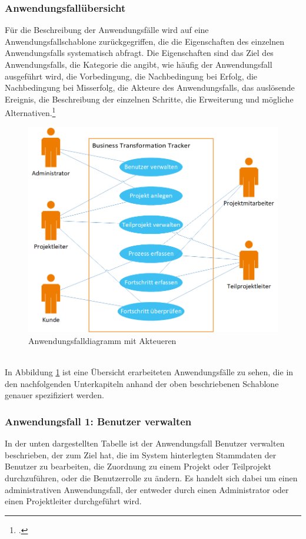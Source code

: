 \subsubsection{Anwendungsfallübersicht}
Für die Beschreibung der Anwendungsfälle wird auf eine Anwendungsfallschablone zurückgegriffen, die die Eigenschaften des einzelnen Anwendungsfalls systematisch abfragt. Die Eigenschaften sind das Ziel des Anwendungsfalls, die Kategorie die angibt, wie häufig der Anwendungsfall ausgeführt wird, die Vorbedingung, die Nachbedingung bei Erfolg, die Nachbedingung bei Misserfolg, die Akteure des Anwendungsfalls, das auslösende Ereignis, die Beschreibung der einzelnen Schritte, die Erweiterung und mögliche Alternativen.\footcite[Vgl.][S. 261]{balzert}
\begin{figure}[h]
    \centering
    \includegraphics[scale=0.67]{./Bilder/Anwendungsfalldiagramm.png}
    \caption[Anwendungsfalldiagramm]{Anwendungsfalldiagramm mit Akteueren}
    \label{fig:Anwendungsfalldiagramm}
\end{figure}
\\In Abbildung \ref{fig:Anwendungsfalldiagramm} ist eine Übersicht erarbeiteten Anwendungsfälle zu sehen, die in den nachfolgenden Unterkapiteln anhand der oben beschriebenen Schablone genauer spezifiziert werden.

\newpage
\subsubsection{Anwendungsfall 1: Benutzer verwalten}
In der unten dargestellten Tabelle ist der Anwendungsfall \glqq{}Benutzer verwalten\grqq{} beschrieben, der zum Ziel hat, die im System hinterlegten Stammdaten der Benutzer zu bearbeiten, die Zuordnung zu einem Projekt oder Teilprojekt durchzuführen, oder die Benutzerrolle zu ändern. Es handelt sich dabei um einen administrativen Anwendungsfall, der entweder durch einen Administrator oder einen Projektleiter durchgeführt wird.\\


